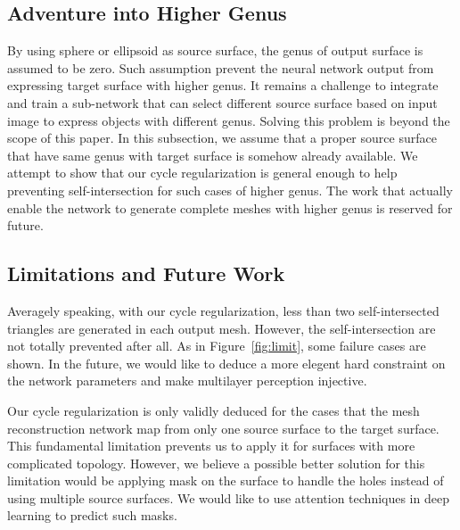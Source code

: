 \subsection{Adventure into Higher Genus}
By using sphere or ellipsoid as source surface, the genus of output surface is assumed to be zero. Such assumption prevent the neural network output from expressing target surface with higher genus. It remains a challenge to integrate and train a sub-network that can select different source surface based on input image to express objects with different genus. Solving this problem is beyond the scope of this paper. In this subsection, we assume that a proper source surface that have same genus with target surface is somehow already available. We attempt to show that our cycle regularization is general enough to help preventing self-intersection for such cases of higher genus. The work that actually enable the network to generate complete meshes with higher genus is reserved for future.     


\subsection{Limitations and Future Work}
Averagely speaking, with our cycle regularization, less than two self-intersected triangles are generated in each output mesh. However, the self-intersection are not totally prevented after all. As in Figure~\ref{fig:limit}, some failure cases are shown. In the future,  we would like to deduce a more elegent hard constraint on the network parameters and make multilayer perception injective. 

Our cycle regularization is only validly deduced for the cases that the mesh reconstruction network map from only one source surface to the target surface. This fundamental limitation prevents us to apply it for surfaces with more complicated topology. However, we believe a possible better solution for this limitation would be applying mask on the surface to handle the holes instead of using multiple source surfaces. We would like to use attention techniques in deep learning to predict such masks.